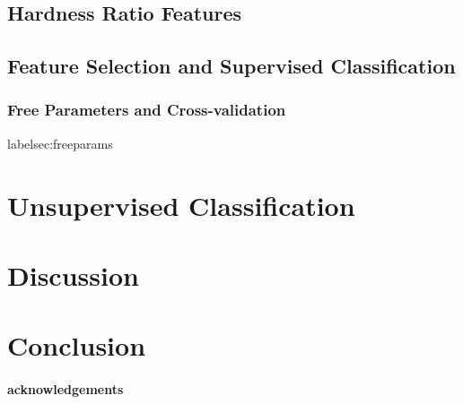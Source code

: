 \documentclass[12pt]{emulateapj}
\begin{document}
\subsection{Hardness Ratio Features}

\subsection{Feature Selection and Supervised Classification}

\subsubsection{Free Parameters and Cross-validation}
label{sec:freeparams}


\section{Unsupervised Classification}


\section{Discussion}


\section{Conclusion}

\paragraph{acknowledgements}

%
%
\end{document}
